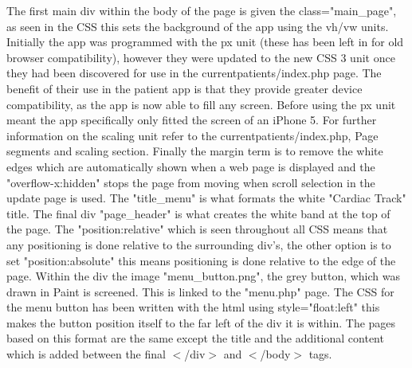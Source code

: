 \documentclass[11pt]{article}
\begin{document}
The first main div within the body of the page is given the class="main\_page", as seen in the CSS this sets the background of the app using the vh/vw units. Initially the app was programmed with the px unit (these has been left in for old browser compatibility), however they were updated to the new CSS 3 unit once they had been discovered for use in the currentpatients/index.php page. The benefit of their use in the patient app is that they provide greater device compatibility, as the app is now able to fill any screen. Before using the px unit meant the app specifically only fitted the screen of an iPhone 5. For further information on the scaling unit refer to the currentpatients/index.php, Page segments and scaling section. Finally the margin term is to remove the white edges which are automatically shown when a web page is displayed and the "overflow-x:hidden" stops the page from moving when scroll selection in the update page is used. The "title\_menu" is what formats the white "Cardiac Track" title. The final div "page\_header" is what creates the white band at the top of the page. The "position:relative" which is seen throughout all CSS means that any positioning is done relative to the surrounding div's, the other option is to set "position:absolute" this means positioning is done relative to the edge of the page. Within the div the image "menu\_button.png", the grey button, which was drawn in Paint \cite{paint} is screened. This is linked to the "menu.php" page. The CSS for the menu button has been written with the html using style="float:left" this makes the button position itself to the far left of the div it is within. The pages based on this format are the same except the title and the additional content which is added between the final $<$/div$>$ and $<$/body$>$ tags. 
\end{document}
